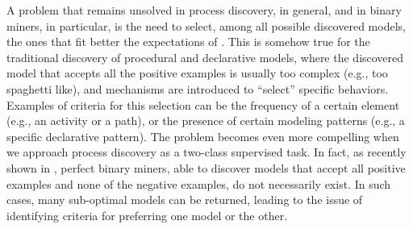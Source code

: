 A problem that remains unsolved in process discovery, in general, and in binary miners, in particular, is the need to select, among all possible discovered models, the ones that fit better the expectations of . This is somehow true for the traditional discovery of procedural and declarative models, where the discovered model that accepts all the positive examples is usually too complex (e.g., too spaghetti like), and mechanisms are introduced to ``select'' specific behaviors. Examples of criteria for this selection can be the frequency of a certain element (e.g., an activity or a path), or the presence of certain modeling patterns (e.g., a specific declarative pattern).   
The problem becomes even more compelling when we approach process discovery as a two-class supervised task. In fact, as recently shown in \cite{DBLP:conf/bpm/SlaatsDB21}, perfect binary miners, able to discover models that accept all positive examples and none of the negative examples, do not necessarily exist. In such cases, many sub-optimal models can be returned, leading to the issue of identifying criteria for preferring one model or the other.
 
